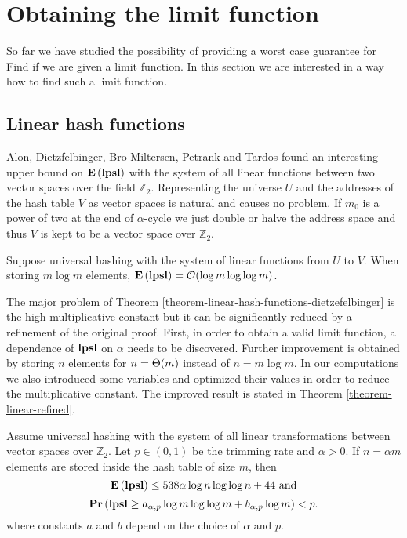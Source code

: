 \section{Obtaining the limit function}
\label{section-limit}

So far we have studied the possibility of providing a worst case guarantee for Find if we are given a limit function. 
In this section we are interested in a way how to find such a limit function.

\subsection{Linear hash functions}
Alon, Dietzfelbinger, Bro Miltersen, Petrank and Tardos \cite{DBLP:journals/jacm/AlonDMPT99} found an interesting upper bound on $\mathbf{E}\left(\mathbf{lpsl}\right)$ with the system of all linear functions between two vector spaces over the field $\mathbb{Z}_2$. 
Representing the universe $U$ and the addresses of the hash table $V$ as vector spaces is natural and causes no problem. 
If $m_0$ is a power of two at the end of $\alpha$-cycle we just double or halve the address space and thus $V$ is kept to be a vector space over $\mathbb{Z}_2$.

\begin{theorem}
\label{theorem-linear-hash-functions-dietzefelbinger}
Suppose universal hashing with the system of linear functions from $U$ to $V$. 
When storing $m \log m$ elements, $\mathbf{E}\left(\mathbf{lpsl}\right) = \mathcal{O}(\log m \log \log m)$. 
\end{theorem}

The major problem of Theorem \ref{theorem-linear-hash-functions-dietzefelbinger} is the high multiplicative constant but it can be significantly reduced by a refinement of the original proof. 
First, in order to obtain a valid limit function, a dependence of $\mathbf{lpsl}$ on $\alpha$ needs to be discovered.
Further improvement is obtained by storing $n$ elements for $n = \mathrm{\Theta}(m)$ instead of $n = m \log m$.
In our computations we also introduced some variables and optimized their values in order to reduce the multiplicative constant.
The improved result is stated in Theorem \ref{theorem-linear-refined}.

\begin{theorem}
\label{theorem-linear-refined}
Assume universal hashing with the system of all linear transformations between vector spaces over $\mathbb{Z}_2$. 
Let $p \in (0, 1)$ be the trimming rate and $\alpha > 0$. 
If $n = \alpha m$ elements are stored inside the hash table of size $m$, then $$\mathbf{E}\left(\mathbf{lpsl}\right) \leq 538 \alpha \log n \log \log n + 44\mbox{ and}$$ $$\mathbf{Pr}\left(\mathbf{lpsl} \geq a_{\alpha, p} \log m \log \log m + b_{\alpha, p}\log m\right) < p.$$ where constants $a$ and $b$ depend on the choice of $\alpha$ and $p$.
\end{theorem}

